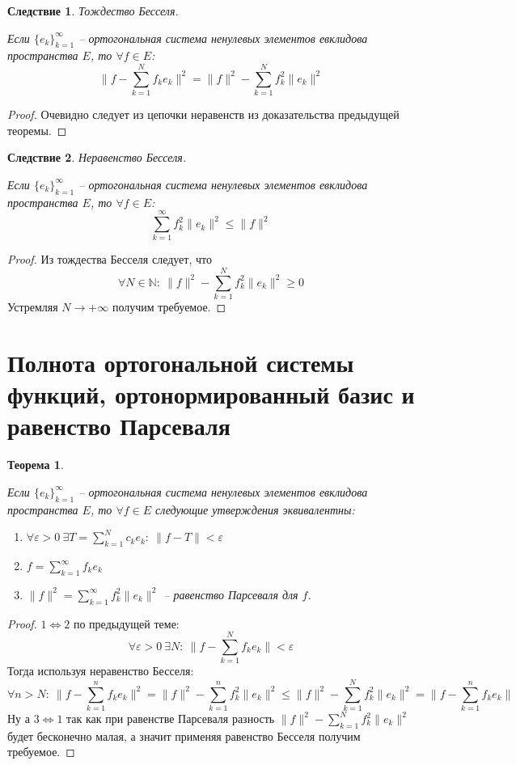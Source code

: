 \documentclass[a4paper,12pt]{article}
\renewcommand{\leq}{\ensuremath{\leqslant}}
\renewcommand{\geq}{\ensuremath{\geqslant}}
\theoremstyle{plain}
\newtheorem{theorem}{Теорема}[section]
\newtheorem*{corollary}{Следствие}
\theoremstyle{definition}
\theoremstyle{remark}
\begin{document}
\begin{corollary}
	Тождество Бесселя.

	Если $\{e_k\}_{k = 1}^\infty$ -- ортогональная система ненулевых элементов евклидова пространства $E$, то $\forall f \in E$:
	\[\|f - \sum_{k = 1}^N f_ke_k\|^2 = \|f\|^2 - \sum_{k = 1}^Nf_k^2\|e_k\|^2\]
\end{corollary}
\begin{proof}
	Очевидно следует из цепочки неравенств из доказательства предыдущей теоремы.
\end{proof}

\begin{corollary}
	Неравенство Бесселя.

	Если $\{e_k\}_{k = 1}^\infty$ -- ортогональная система ненулевых элементов евклидова пространства $E$, то $\forall f \in E$:
	\[\sum_{k = 1}^\infty f_k^2 \|e_k\|^2 \leq \|f\|^2\]
\end{corollary}
\begin{proof}
	Из тождества Бесселя следует, что
	\[\forall N \in \mathbb{N}:\: \|f\|^2 - \sum_{k = 1}^Nf_k^2\|e_k\|^2 \geq 0\]
	Устремляя $N \to +\infty$ получим требуемое.
\end{proof}

\section{Полнота ортогональной системы функций, ортонормированный базис и равенство Парсеваля}
\begin{theorem}
	\label{THREE_EQUIV}

	Если $\{e_k\}_{k = 1}^\infty$ -- ортогональная система ненулевых элементов евклидова пространства $E$, то $\forall f \in E$ следующие утверждения эквивалентны:
	\begin{enumerate}
		\item $\forall \varepsilon > 0 \: \exists T = \sum_{k = 1}^N c_ke_k :\: \|f - T\| < \varepsilon$
		\item $f = \sum_{k = 1}^\infty f_ke_k$
		\item $\|f\|^2 = \sum_{k = 1}^\infty f_k^2 \|e_k\|^2$ -- равенство Парсеваля для $f$.
	\end{enumerate}
\end{theorem}
\begin{proof}
	$1 \Leftrightarrow 2$ по предыдущей теме:
	\[\forall \varepsilon > 0 \: \exists N :\: \|f - \sum_{k = 1}^N f_ke_k\| < \varepsilon\]
	Тогда используя неравенство Бесселя:
	\[\forall n > N :\: \|f - \sum_{k = 1}^n f_ke_k\|^2 = \|f\|^2 - \sum_{k = 1}^n f_k^2\|e_k\|^2 \leq \|f\|^2 - \sum_{k = 1}^N f_k^2\|e_k\|^2 = \|f - \sum_{k = 1}^nf_ke_k\|\]
	Ну а $3 \Leftrightarrow 1$ так как при равенстве Парсеваля разность $\|f\|^2 - \sum_{k = 1}^N f_k^2\|e_k\|^2$ будет бесконечно малая, а значит применяя равенство Бесселя получим требуемое.
\end{proof}
\end{document}
